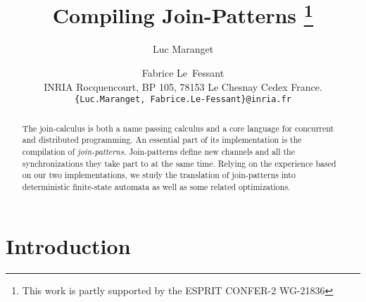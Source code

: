 
\addtolength{\topmargin}{-1cm}



\def\showgraph{\par\medskip\centerline{\begin{toimage}
\box\graph
\end{toimage}
\imageflush}\medskip}
\def\status#1{{\tt #1}}

\title{Compiling Join-Patterns
\footnote{
This work is partly supported by the ESPRIT 
    CONFER-2 WG-21836}}
\author {Luc Maranget \and Fabrice
Le~Fessant\\[.5em]
INRIA Rocquencourt, 
    BP 105, 78153 Le Chesnay Cedex France.
\\[.5em]
{\tt\small \{Luc.Maranget, Fabrice.Le-Fessant\}@inria.fr}
}

\date {}






\maketitle
\thispagestyle{empty}

\begin{abstract}
  
  The join-calculus is both a name passing calculus and a core
  language for concurrent and distributed programming.  An essential
  part of its implementation is the compilation of {\em
    join-patterns}.  Join-patterns define new channels and all the
  synchronizations they take part to at the same time.  Relying on the
  experience based on our two implementations, we study the
  translation of join-patterns into deterministic finite-state
  automata as well as some related optimizations.

  
\end{abstract}
\tableofcontents

\section {Introduction}

